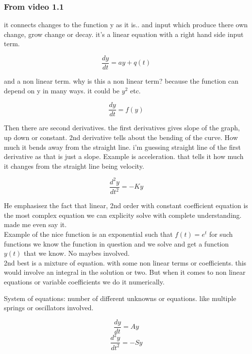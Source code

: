 \documentclass[12pt]{article}
\begin{document}
\subsubsection*{From video 1.1}
it connects changes to the function y as it is.. and input which produce there own change, grow change or decay. it's a linear equation
with a right hand side input term. 
\begin{center}
    \begin{equation}
        \frac{dy}{dt} = ay + q(t) 
    \end{equation}
\end{center}
and a non linear term. why is this a non linear term? because the function can depend on y in many ways. it could be $y^2$ etc.
\begin{center}
    \begin{equation}
        \frac{dy}{dt} = f(y)
    \end{equation}
\end{center}

Then there are second derivatives. the first derivatives gives slope of the graph, up down or constant. 2nd derivative tells about the bending of the curve. 
How much it bends away from the straight line. i'm guessing straight line of the first derivative as that is just a slope. 
Example is acceleration. that tells it how much it changes from the straight line being velocity. 
\begin{center}
    \begin{equation}
        \frac{d^2y}{dt^2} = - Ky
    \end{equation}
\end{center}

He emphasisez the fact that linear, 2nd order with constant coefficient equation is the most complex equation we can explicity solve with complete understanding. made me even say it.\\
Example of the nice function is an exponential such that $f(t) = e^t$ for such functions we know the function in question and we solve and get a function $y(t)$ that we know. No maybes involved. 
\\2nd best is a mixture of equation. with some non linear terms or coefficients. this would involve an integral in the solution or two. But when it comes to non linear equations or variable coefficients we do it numerically. 

System of  equations: number of different unknowns or  equations. like multiple springs or oscillators involved. 
\\
\begin{center}
    \begin{equation}
        \frac{dy}{dt} = Ay
    \end{equation}
    \begin{equation}
        \frac{d^2y}{dt^2} = -Sy
    \end{equation}
\end{center}
\end{document}
